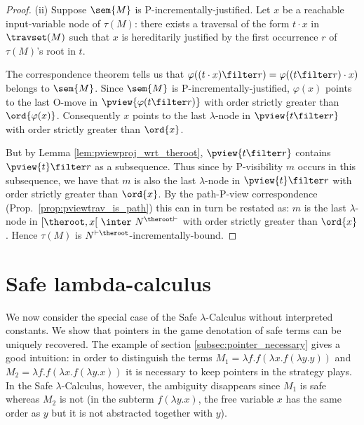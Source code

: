 \begin{proof}
\noindent (ii) Suppose $\sem{M}$ is P-incrementally-justified. Let
$x$ be a reachable input-variable node of $\tau(M)$: there exists a
traversal of the form $t \cdot x$ in $\travset(M)$ such that $x$ is
hereditarily justified by the first occurrence $r$ of $\tau(M)$'s
root in $t$.

The correspondence theorem tells us that $\varphi((t \cdot x)
\filter r) = \varphi((t \filter r) \cdot x)$ belongs to $\sem{M}$.
Since $\sem{M}$ is P-incrementally-justified, $\varphi(x)$ points to
the last O-move in $\pview{\varphi(t \filter r)}$ with order
strictly greater than $\ord{\varphi(x)}$. Consequently $x$ points to
the last $\lambda$-node in $\pview{t \filter r}$ with order strictly
greater than $\ord{x}$.

But by Lemma \ref{lem:pviewproj_wrt_theroot}, $\pview{t \filter r}$
contains $\pview{t} \filter r$ as a subsequence. Thus since by
P-visibility $m$ occurs in this subsequence, we have that $m$ is
also the last $\lambda$-node in $\pview{t} \filter r$ with order
strictly greater than $\ord{x}$. By the path-P-view correspondence
(Prop.\ \ref{prop:pviewtrav_is_path}) this can in turn be restated
as: $m$ is the last $\lambda$-node in $[\theroot,x[\  \inter\
N^{\theroot \vdash}$ with order strictly greater than $\ord{x}$.
Hence $\tau(M)$ is $N^{\vdash \theroot}$-incrementally-bound.
\end{proof}

\section{Safe lambda-calculus}

We now consider the special case of the Safe $\lambda$-Calculus
without interpreted constants. We show that pointers in the game
denotation of safe terms can be uniquely recovered. The example of
section \ref{subsec:pointer_necessary} gives a good intuition: in
order to distinguish the terms $M_1 = \lambda f . f (\lambda x . f
(\lambda y .y ))$ and $M_2 = \lambda f . f (\lambda x . f (\lambda y
.x ))$ it is necessary to keep pointers in the strategy plays. In
the Safe $\lambda$-Calculus, however, the ambiguity disappears since
$M_1$ is safe whereas $M_2$ is not (in the subterm $f (\lambda y .
x)$, the free variable $x$ has the same order as $y$ but it is not
abstracted together with $y$).



